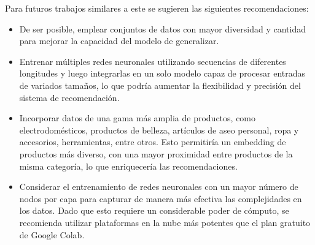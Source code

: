 \documentclass[runningheads]{llncs}
\begin{document}
Para futuros trabajos similares a este se sugieren las siguientes recomendaciones:
\begin{itemize}
	\item De ser posible, emplear conjuntos de datos con mayor diversidad y cantidad para mejorar la capacidad del modelo de generalizar.
	\item Entrenar múltiples redes neuronales utilizando secuencias de diferentes longitudes y luego integrarlas en un solo modelo capaz de procesar entradas de variados tamaños, lo que podría aumentar la flexibilidad y precisión del sistema de recomendación.
	\item Incorporar datos de una gama más amplia de productos, como electrodomésticos, productos de belleza, artículos de aseo personal, ropa y accesorios, herramientas, entre otros. Esto permitiría un embedding de productos más diverso, con una mayor proximidad entre productos de la misma categoría, lo que enriquecería las recomendaciones.
	\item Considerar el entrenamiento de redes neuronales con un mayor número de nodos por capa para capturar de manera más efectiva las complejidades en los datos. Dado que esto requiere un considerable poder de cómputo, se recomienda utilizar plataformas en la nube más potentes que el plan gratuito de Google Colab.
\end{itemize}
\end{document}
